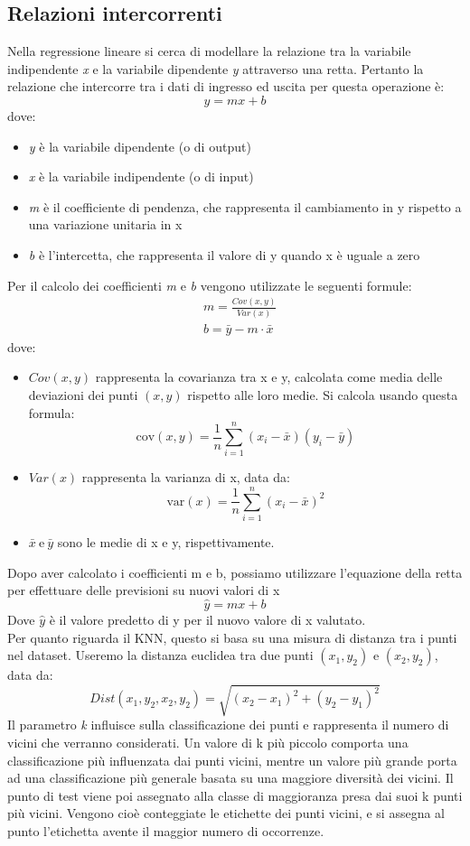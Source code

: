 \documentclass[11pt]{article}
\theoremstyle{definition}
\begin{document}
\subsection{Relazioni intercorrenti}
Nella regressione lineare si cerca di modellare la relazione tra la variabile indipendente \textit{x} e la variabile dipendente \textit{y} attraverso una retta. Pertanto la relazione che intercorre tra i dati di ingresso ed uscita per questa operazione è:
$$
y=mx+b
$$
dove:
\begin{itemize}
\item \textit{y} è la variabile dipendente (o di output)
\item \textit{x} è la variabile indipendente (o di input)
\item \textit{m} è il coefficiente di pendenza, che rappresenta il cambiamento in y rispetto a una variazione unitaria in x
\item \textit{b} è l'intercetta, che rappresenta il valore di y quando x è uguale a zero
\end{itemize}
Per il calcolo dei coefficienti \textit{m} e \textit{b} vengono utilizzate le seguenti formule:
\begin{align*}
&m = \frac{Cov(x,y)}{Var(x)}\\
&b=\bar{y}-m\cdot \bar{x}
\end{align*}
dove:
\begin{itemize}
\item $Cov(x,y)$ rappresenta la covarianza tra x e y, calcolata come media delle deviazioni dei punti $(x,y)$ rispetto alle loro medie. Si calcola usando questa formula:
$$
\text{cov}(x, y) = \frac{1}{n} \sum_{i=1}^{n} (x_i - \bar{x})(y_i - \bar{y})
$$
\item $Var(x)$ rappresenta la varianza di x, data da:
$$
\text{var}(x) = \frac{1}{n} \sum_{i=1}^{n} (x_i - \bar{x})^2
$$
\item $\bar{x} \ \text{e} \ \bar{y}$ sono le medie di x e y, rispettivamente.
\end{itemize}
Dopo aver calcolato i coefficienti m e b, possiamo utilizzare l'equazione della retta per effettuare delle previsioni su nuovi valori di x
$$
\hat{y} = mx+b
$$
Dove $\hat{y}$ è il valore predetto di y per il nuovo valore di x valutato.\\
\newline
Per quanto riguarda il KNN, questo si basa su una misura di distanza tra i punti nel dataset. Useremo la distanza euclidea tra due punti $(x_1,y_2)$ e $(x_2,y_2)$, data da:
$$
Dist(x_1,y_2,x_2,y_2)=\sqrt{(x_2-x_1)^2 + (y_2-y_1)^2}
$$ 
Il parametro \textit{k} influisce sulla classificazione dei punti e rappresenta il numero di vicini che verranno considerati. Un valore di k più piccolo comporta una classificazione più influenzata dai punti vicini, mentre un valore più grande porta ad una classificazione più generale basata su una maggiore diversità dei vicini. Il punto di test viene poi assegnato alla classe di maggioranza presa dai suoi k punti più vicini. Vengono cioè conteggiate le etichette dei punti vicini, e si assegna al punto l'etichetta avente il maggior numero di occorrenze.
\end{document}
